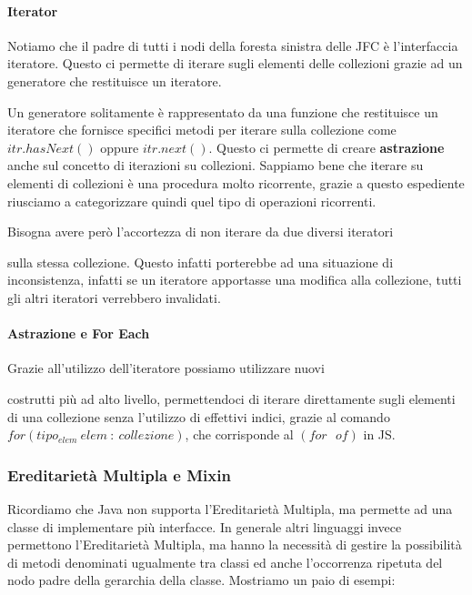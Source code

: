 \documentclass{article}
\begin{document}
\paragraph{Iterator} Notiamo che il padre di tutti i nodi della foresta sinistra delle JFC è l'interfaccia iteratore. Questo ci permette di iterare sugli elementi delle collezioni grazie ad un generatore che restituisce un iteratore.

Un generatore solitamente è rappresentato da una funzione che restituisce un iteratore che fornisce specifici metodi per iterare sulla collezione come $itr.hasNext()$ oppure $itr.next()$. Questo ci permette di creare \textbf{astrazione} anche sul concetto di iterazioni su collezioni. Sappiamo bene che iterare su elementi di collezioni è una procedura molto ricorrente, grazie a questo espediente riusciamo a categorizzare quindi quel tipo di operazioni ricorrenti.

Bisogna avere però l'accortezza di non iterare da due diversi iteratori

sulla stessa collezione. Questo infatti porterebbe ad una situazione di inconsistenza, infatti se un iteratore apportasse una modifica alla collezione, tutti gli altri iteratori verrebbero invalidati.

\newpage

\paragraph{Astrazione e For Each} Grazie all'utilizzo dell'iteratore possiamo utilizzare nuovi

costrutti più ad alto livello, permettendoci di iterare direttamente sugli elementi di una collezione senza l'utilizzo di effettivi indici, grazie al comando $for (tipo_{elem} \: elem \: : \: collezione) $, che corrisponde al $(for \: \: \: of)$ in JS.

\subsubsection{Ereditarietà Multipla e Mixin}

Ricordiamo che Java non supporta l'Ereditarietà Multipla, ma permette ad una classe di implementare più interfacce. In generale altri linguaggi invece permettono l'Ereditarietà Multipla, ma hanno la necessità di gestire la possibilità di metodi denominati ugualmente tra classi ed anche l'occorrenza ripetuta del nodo padre della gerarchia della classe. Mostriamo un paio di esempi:
\end{document}
